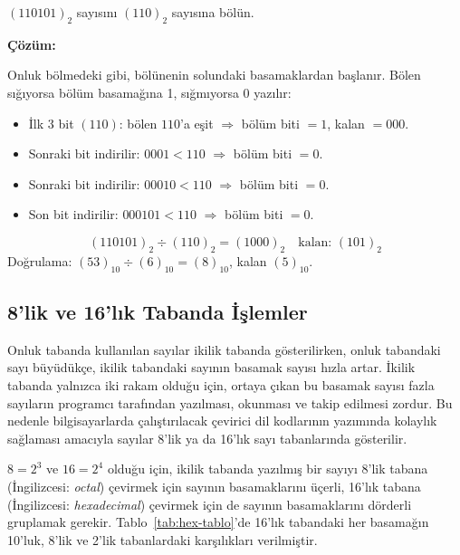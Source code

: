 \begin{ornek}[A.8]
$(110101)_2$ sayısını $(110)_2$ sayısına bölün.

\textbf{Çözüm:}

Onluk bölmedeki gibi, bölünenin solundaki basamaklardan başlanır. Bölen sığıyorsa bölüm basamağına 1, sığmıyorsa 0 yazılır:
\begin{itemize}[nosep]
    \item İlk 3 bit $(110)$: bölen $110$'a eşit $\Rightarrow$ bölüm biti $= 1$, kalan $= 000$.
    \item Sonraki bit indirilir: $0001 < 110$ $\Rightarrow$ bölüm biti $= 0$.
    \item Sonraki bit indirilir: $00010 < 110$ $\Rightarrow$ bölüm biti $= 0$.
    \item Son bit indirilir: $000101 < 110$ $\Rightarrow$ bölüm biti $= 0$.
\end{itemize}
\[
(110101)_2 \div (110)_2 = (1000)_2 \quad \text{kalan: } (101)_2
\]
Doğrulama: $(53)_{10} \div (6)_{10} = (8)_{10}$, kalan $(5)_{10}$.
\end{ornek}


\subsection{8'lik ve 16'lık Tabanda İşlemler}

Onluk tabanda kullanılan sayılar ikilik tabanda gösterilirken, onluk tabandaki sayı büyüdükçe, ikilik tabandaki sayının basamak sayısı hızla artar. İkilik tabanda yalnızca iki rakam olduğu için, ortaya çıkan bu basamak sayısı fazla sayıların programcı tarafından yazılması, okunması ve takip edilmesi zordur. Bu nedenle bilgisayarlarda çalıştırılacak çevirici dil kodlarının yazımında kolaylık sağlaması amacıyla sayılar 8'lik ya da 16'lık sayı tabanlarında gösterilir.

$8 = 2^3$ ve $16 = 2^4$ olduğu için, ikilik tabanda yazılmış bir sayıyı 8'lik tabana (İngilizcesi: \textit{octal}) çevirmek için sayının basamaklarını üçerli, 16'lık tabana (İngilizcesi: \textit{hexadecimal}) çevirmek için de sayının basamaklarını dörderli gruplamak gerekir. Tablo~\ref{tab:hex-tablo}'de 16'lık tabandaki her basamağın 10'luk, 8'lik ve 2'lik tabanlardaki karşılıkları verilmiştir.

